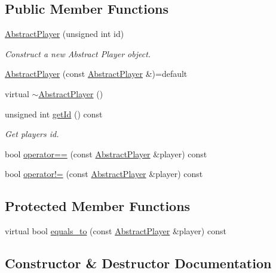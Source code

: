 \subsection*{Public Member Functions}
\begin{DoxyCompactItemize}
\item 
\hyperlink{classgame_1_1_abstract_player_a7164932ca617a90d1b67a58b6d32e095}{Abstract\+Player} (unsigned int id)
\begin{DoxyCompactList}\small\item\em Construct a new Abstract Player object. \end{DoxyCompactList}\item 
\hyperlink{classgame_1_1_abstract_player_aa2ee6723a58b2432368d845c16ca978f}{Abstract\+Player} (const \hyperlink{classgame_1_1_abstract_player}{Abstract\+Player} \&)=default
\item 
virtual \hyperlink{classgame_1_1_abstract_player_a0943c270c648d668b696757004955d72}{$\sim$\+Abstract\+Player} ()
\item 
unsigned int \hyperlink{classgame_1_1_abstract_player_a88e33e40f98283588a535f66bf1b6640}{get\+Id} () const
\begin{DoxyCompactList}\small\item\em Get player\textquotesingle{}s id. \end{DoxyCompactList}\item 
bool \hyperlink{classgame_1_1_abstract_player_aaffd1859f7b8b2cd3a00fc47432800e4}{operator==} (const \hyperlink{classgame_1_1_abstract_player}{Abstract\+Player} \&player) const
\item 
bool \hyperlink{classgame_1_1_abstract_player_a3c88c5ef8f89fd74b3e48ff636049c94}{operator!=} (const \hyperlink{classgame_1_1_abstract_player}{Abstract\+Player} \&player) const
\end{DoxyCompactItemize}
\subsection*{Protected Member Functions}
\begin{DoxyCompactItemize}
\item 
virtual bool \hyperlink{classgame_1_1_abstract_player_adacb7220ee80c15058b9e2619bd9c72b}{equals\+\_\+to} (const \hyperlink{classgame_1_1_abstract_player}{Abstract\+Player} \&player) const
\end{DoxyCompactItemize}


\subsection{Constructor \& Destructor Documentation}
\mbox{\label{classgame_1_1_abstract_player_a7164932ca617a90d1b67a58b6d32e095}} 
